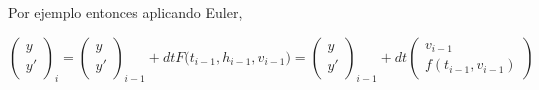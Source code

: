 Por ejemplo entonces aplicando Euler,

\begin{equation}\label{EqnEulerOnHeight}
  \begin{pmatrix}  y \\   y '  \end{pmatrix}_i = 
    \begin{pmatrix}  y \\   y '  \end{pmatrix}_{i-1} +
      dt F \Big( t_{i-1} , h_{i-1}, v_{i-1} \Big)=
      \begin{pmatrix}  y \\   y '  \end{pmatrix}_{i-1} +
	dt \begin{pmatrix} v_{i-1} \\ f(t_{i-1} , v_{i-1} ) \end{pmatrix}
\end{equation}


